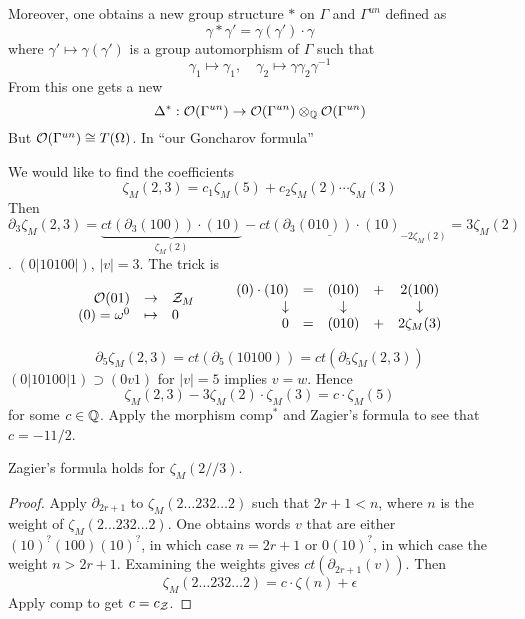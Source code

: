 Moreover, one obtains a new group structure $\ast$ on $\Gamma$ and $\Gamma^{un}$ defined as
\[
\gamma \ast \gamma' = \gamma(\gamma') \cdot \gamma
\]
where $\gamma' \mapsto \gamma(\gamma')$ is a group automorphism of $\Gamma$ such that
\[
\gamma_1 \mapsto \gamma_1, \quad \gamma_2 \mapsto \gamma \gamma_2 \gamma^{-1}
\]
From this one gets a new
\[
\Delta^{\ast} : \mathcal{O}(\Gamma^{un}) \to \mathcal{O}(\Gamma^{un}) \otimes_{\mathbb{Q}} \mathcal{O}(\Gamma^{un})
\]
But $\mathcal{O}(\Gamma^{un}) \cong T(\Omega)$. In ``our Goncharov formula''

\begin{exam}
We would like to find the coefficients
\[
\zeta_M(2,3) = c_1 \zeta_M(5) + c_2 \zeta_M(2) \cdots \zeta_M(3)
\]
Then $\partial_3 \zeta_M(2,3) = \underbrace{ct(\partial_3(100)) \cdot (10)}_{\zeta_M(2)} - \underline{ct(\partial_3(010)) \cdot (10)}_{-2\zeta_M(2)} = 3\zeta_M(2)$.
$(0|10100|)$, $|v| = 3$.
The trick is
\[
\begin{array}{rcl}
\mathcal{O}(01) & \to & \mathcal{Z}_M \\
(0) = \omega^0 & \mapsto & 0
\end{array}
\qquad
\begin{array}{rcccc}
(0) \cdot (10) & = &(010) & + & 2(100) \\
\downarrow & & \downarrow & & \downarrow \\
0 & = & (010) & + & 2\zeta_M(3)
\end{array}
\]

\[
\partial_5 \zeta_M(2,3) = ct(\partial_5(10100)) = ct(\partial_5 \zeta_M(2,3))
\]
$(0|10100|1) \supset (0v1)$ for $|v|=5$ implies $v=w$.
Hence
\[
\zeta_M(2,3) - 3\zeta_M(2) \cdot \zeta_M(3) = c \cdot \zeta_M(5)
\]
for some $c \in \mathbb{Q}$. Apply the morphism $\mathrm{comp}^*$ and Zagier's formula to see that $c = -11/2$.
\end{exam}

\begin{prop}
Zagier's formula holds for $\zeta_M(2//3)$.
\end{prop}
\begin{proof}
Apply $\partial_{2r+1}$ to $\zeta_M(2 \ldots 232 \ldots 2)$ such that $2r+1 < n$, where $n$ is the weight of $\zeta_M(2 \ldots 232 \ldots 2)$. One obtains words $v$ that are either $(10)^{?}(100)(10)^{?}$, in which case $n = 2r+1$ or $0(10)^{?}$, in which case the weight $n > 2r+1$. Examining the weights gives $ct(\partial_{2r+1}(v))$. Then
\[
\zeta_M(2 \ldots 232 \ldots 2) = c \cdot \zeta(n) + \epsilon
\]
Apply $\mathrm{comp}$ to get $c = c_{\mathcal{Z}}$.
\end{proof}

